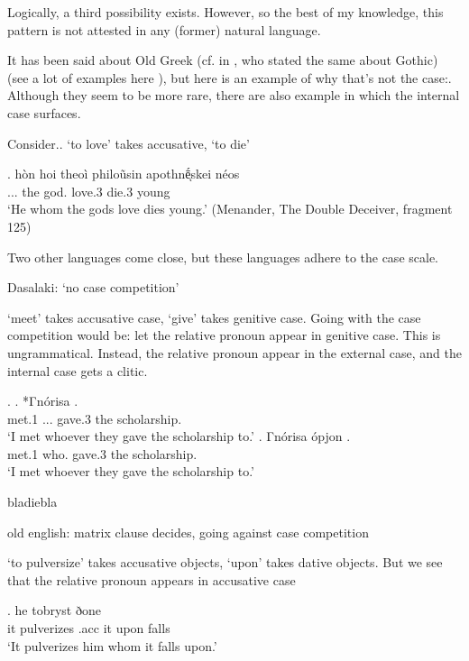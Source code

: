 Logically, a third possibility exists. However, so the best of my knowledge, this pattern is not attested in any (former) natural language.

It has been said about Old Greek (cf. in \citealt{cinque2005}, who stated the same about Gothic) (see a lot of examples here \citealt{kakarikos2014}), but here is an example of why that's not the case:. Although they seem to be more rare, there are also example in which the internal case surfaces.

Consider..
 `to love' takes accusative,  `to die'

\exg. hòn hoi theoì philoũsin apothnḗͅskei néos\\
... the god. love.3 die.3 young\\
`He whom the gods love dies young.' (Menander, The Double  Deceiver, fragment 125)

Two other languages come close, but these languages adhere to the case scale.

Dasalaki: `no case competition'

`meet' takes accusative case, `give' takes genitive case. Going with the case competition would be: let the relative pronoun appear in genitive case. This is ungrammatical. Instead, the relative pronoun appear in the external case, and the internal case gets a clitic.

\ex.
\ag. *Γnórisa    .\\
met.1 ... gave.3 the scholarship.\\
`I met whoever they gave the scholarship to.'
\bg. Γnórisa ópjon    .\\
met.1 who.  gave.3 the scholarship.\\
`I met whoever they gave the scholarship to.'

bladiebla \citep{harbert1983}

old english: matrix clause decides, going against case competition

 `to pulversize' takes accusative objects,  `upon' takes dative objects. But we see that the relative pronoun appears in accusative case

\exg. he tobryst ðone    \\
 it pulverizes\scsub{[acc]} .\ac{acc}  it upon\scsub{[dat]} falls\\
`It pulverizes him whom it falls upon.' \label{ex:old-english}

